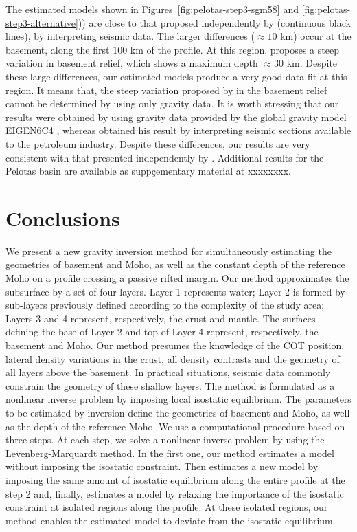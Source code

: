 \documentclass[manuscript]{geophysics}
\begin{document}
The estimated models shown in Figures~\ref{fig:pelotas-step3-sgm58} and \ref{fig:pelotas-step3-alternative})) 
are close to that proposed independently by \citet{zalan2015} (continuous black lines), by
interpreting seismic data.
The larger differences ($\approx 10$ km) occur at the basement, along the first 
$100$ km of the profile.
At this region, \citeauthor{zalan2015} proposes a steep variation in basement
relief, which shows a maximum depth $\approx 30$ km. 
Despite these large differences,
our estimated models produce a very good data fit
at this region. It means that, the steep variation 
proposed by \citeauthor{zalan2015} in the basement relief cannot be determined by 
using only gravity data.
It is worth stressing that our results were obtained by using gravity data
provided by the global gravity model EIGEN6C4 \citep{forste2014}, whereas 
\citet{zalan2015} obtained his result by interpreting seismic sections
available to the petroleum industry. Despite these differences, our results are very 
consistent with that presented independently by \citet{zalan2015}.
Additional results for the Pelotas basin are available as suppçementary material at xxxxxxxx.


\section{Conclusions}

We present a new gravity inversion method for simultaneously estimating the 
geometries of basement and Moho, as well as the constant depth of the reference Moho 
on a profile crossing a passive rifted margin.
Our method approximates the subsurface by a set of four layers. 
Layer 1 represents water; Layer 2 is formed by 
sub-layers previously defined according to the complexity of the study area; Layers 3 and 4 
represent, respectively, the crust and mantle.
The surfaces defining the base of Layer 2 and top of Layer 4 represent, respectively, 
the basement and Moho.
Our method presumes the knowledge of the COT position, lateral density variations in the crust,
all density contrasts and the geometry of all layers above the basement.
In practical situations, seismic data commonly constrain the geometry of these shallow layers.
The method is formulated as a nonlinear inverse problem by imposing local
isostatic equilibrium.
The parameters to be estimated by inversion define the geometries of basement and Moho, as well as 
the depth of the reference Moho.
We use a computational procedure based on three steps.
At each step, we solve a nonlinear inverse problem by using the Levenberg-Marquardt
method.
In the first one, our method estimates a model without imposing the isostatic constraint.
Then estimates a new model by imposing the same amount of isostatic equilibrium along the
entire profile at the step 2 and, finally, estimates a model by relaxing the importance of
the isostatic constraint at isolated regions along the profile.
At these isolated regions, our method enables the estimated model to deviate from the 
isostatic equilibrium.
\end{document}
